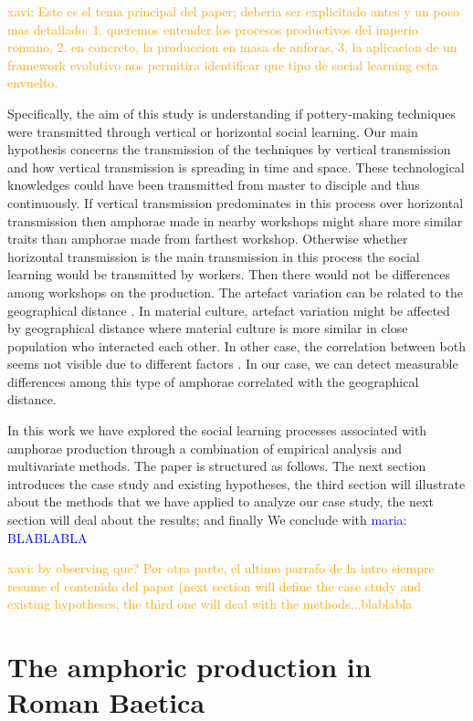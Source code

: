 \documentclass[review]{elsarticle}
\newcommand{\memo}[2]{\textcolor{#1}{#2}}
\newcommand{\xavi}[1]{\memo{orange}{xavi: #1\\}}
\newcommand{\maria}[1]{\memo{blue}{maria: #1\\}}
\begin{document}
\xavi{Este es el tema principal del paper; deberia ser explicitado antes y un poco mas detallado: 1. queremos entender los procesos productivos del imperio romano, 2. en concreto, la produccion en masa de anforas, 3. la aplicacion de un framework evolutivo nos permitira identificar que tipo de social learning esta envuelto.}
 

Specifically, the aim of this study is understanding if pottery-making techniques were transmitted through vertical or horizontal social learning. Our main hypothesis concerns the transmission of the techniques by vertical transmission and how vertical transmission is spreading in time and space. These technological knowledges could have been transmitted from master to disciple and thus continuously. If vertical transmission predominates in this process over horizontal transmission then amphorae made in nearby workshops might share more similar traits than amphorae made from farthest workshop. Otherwise whether horizontal transmission is the main transmission in this process the social learning would be transmitted by workers. Then there would not be differences among workshops on the production. The artefact variation can be related to the geographical distance \citep{bjorklund_effect_2010,shennan_isolation-by-distance_2015, van_strien_isolation-by-distance_2015}. In material culture, artefact variation might be affected by geographical distance where material culture is more similar in close population who interacted each other. In other case, the correlation between both seems not visible due to different factors \citep{hart_effects_2012}. In our case, we can detect measurable differences among this type of amphorae correlated with the geographical distance.

In this work we have explored the social learning processes associated with amphorae production through a combination of empirical analysis and multivariate methods. The paper is structured as follows. The next section introduces the case study and existing hypotheses, the third section will illustrate about the methods that we have applied to analyze our case study, the next section will deal about the results; and finally We conclude with  \maria{BLABLABLA}

\xavi{by observing que? Por otra parte, el ultimo parrafo de la intro siempre resume el contenido del paper (next section will define the case study and existing hypotheses, the third one will deal with the methods...blablabla}

\section{The amphoric production in Roman Baetica}
\end{document}
